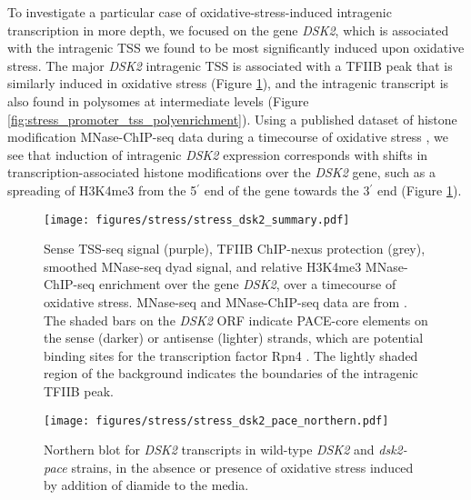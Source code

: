 To investigate a particular case of oxidative-stress-induced intragenic transcription in more depth, we focused on the gene \textit{DSK2}, which is associated with the intragenic TSS we found to be most significantly induced upon oxidative stress.
The major \textit{DSK2} intragenic TSS is associated with a TFIIB peak that is similarly induced in oxidative stress (Figure \ref{fig:stress_dsk2_summary}), and the intragenic transcript is also found in polysomes at intermediate levels (Figure \ref{fig:stress_promoter_tss_polyenrichment}).
Using a published dataset of histone modification MNase-ChIP-seq data during a timecourse of oxidative stress \citep{weiner2015}, we see that induction of intragenic \textit{DSK2} expression corresponds with shifts in transcription-associated histone modifications over the \textit{DSK2} gene, such as a spreading of H3K4me3 from the 5$^\prime$ end of the gene towards the 3$^\prime$ end (Figure \ref{fig:stress_dsk2_summary}).
\begin{figure}[h]
    \texttt{[image: figures/stress/stress\_dsk2\_summary.pdf]}
    \caption[Sense TSS-seq signal, TFIIB ChIP-nexus protection, and MNase-ChIP-seq data at the \textit{DSK2} gene, over an oxidative stress timecourse.]{Sense TSS-seq signal (purple), TFIIB ChIP-nexus protection (grey), smoothed MNase-seq dyad signal, and relative H3K4me3 MNase-ChIP-seq enrichment over the gene \textit{DSK2}, over a timecourse of oxidative stress. MNase-seq and MNase-ChIP-seq data are from \citet{weiner2015}. The shaded bars on the \textit{DSK2} ORF indicate PACE-core elements on the sense (darker) or antisense (lighter) strands, which are potential binding sites for the transcription factor Rpn4 \citep{shirozu2015}. The lightly shaded region of the background indicates the boundaries of the intragenic TFIIB peak.}
    \label{fig:stress_dsk2_summary}
\end{figure}

\begin{wrapfigure}[10]{r}{3in}
    \centering
    \texttt{[image: figures/stress/stress\_dsk2\_pace\_northern.pdf]}
    \caption[Northern blot for \textit{DSK2} transcripts in wild-type \textit{DSK2} and \textit{dsk2-pace} strains, in the absence or presence of oxidative stress.]{Northern blot for \textit{DSK2} transcripts in wild-type \textit{DSK2} and \textit{dsk2-pace} strains, in the absence or presence of oxidative stress induced by addition of diamide to the media.}
    \label{fig:stress_dsk2_pace_northern}
\end{wrapfigure}

